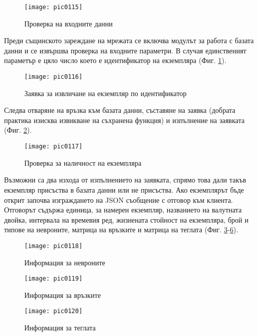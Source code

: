 \begin{figure}[h]
  \centering
  \texttt{[image: pic0115]}
  \caption{Проверка на входните данни}
\label{fig:pic0115}
\end{figure}
\FloatBarrier

Преди същинското зареждане на мрежата се включва модулът за работа с базата данни и се извършва проверка на входните параметри. В случая единственият параметър е цяло число което е идентификатор на екземпляра (Фиг. \ref{fig:pic0115}).

\begin{figure}[h]
  \centering
  \texttt{[image: pic0116]}
  \caption{Заявка за извличане на екземпляр по идентификатор}
\label{fig:pic0116}
\end{figure}
\FloatBarrier

Следва отваряне на връзка към базата данни, съставяне на заявка (добрата практика изисква извикване на съхранена функция) и изпълнение на заявката (Фиг. \ref{fig:pic0116}). 

\begin{figure}[h]
  \centering
  \texttt{[image: pic0117]}
  \caption{Проверка за наличност на екземпляра}
\label{fig:pic0117}
\end{figure}
\FloatBarrier

Възможни са два изхода от изпълнението на заявката, спрямо това дали такъв екземпляр присъства в базата данни или не присъства. Ако екземплярът бъде открит започва изграждането на JSON съобщение с отговор към клиента. Отговорът съдържа единица, за намерен екземпляр, названието на валутната двойка, интервала на времевия ред, жизнената стойност на екземпляра, брой и типове на невроните, матрица на връзките и матрица на теглата (Фиг. \ref{fig:pic0117}-\ref{fig:pic0120}).

\begin{figure}[h]
  \centering
  \texttt{[image: pic0118]}
  \caption{Информация за невроните}
\label{fig:pic0118}
\end{figure}
\FloatBarrier

\begin{figure}[h]
  \centering
  \texttt{[image: pic0119]}
  \caption{Информация за връзките}
\label{fig:pic0119}
\end{figure}
\FloatBarrier

\begin{figure}[h]
  \centering
  \texttt{[image: pic0120]}
  \caption{Информация за теглата}
\label{fig:pic0120}
\end{figure}
\FloatBarrier

